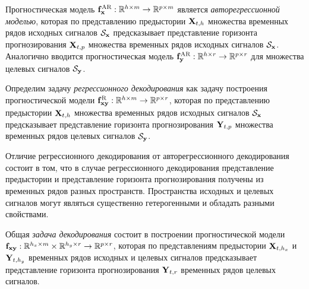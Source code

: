 \documentclass[11pt, a5paper]{dissert}
\begin{document}
\begin{definition}
	\label{ch1:def:autoreg_model}
	Прогностическая модель $\mathbf{f}^{\text{AR}}_{\mathbf{x}}: \mathbb{R}^{h \times m} \rightarrow \mathbb{R}^{p \times m}$ является \textit{авторегрессионной моделью}, которая по представлению предыстории $\mathbf{X}_{t,h}$ множества временных рядов исходных сигналов $\mathcal{S}_{\mathbf{x}}$ предсказывает представление горизонта прогнозирования $\mathbf{X}_{t,p}$ множества временных рядов исходных сигналов $\mathcal{S}_{\mathbf{x}}$.
	Аналогично вводится прогностическая модель $\mathbf{f}^{\text{AR}}_{\mathbf{y}}: \mathbb{R}^{h \times r} \rightarrow \mathbb{R}^{p \times r}$ для множества целевых сигналов $\mathcal{S}_{\mathbf{y}}$.
\end{definition}

\begin{definition}
	\label{ch1:def:reg_model}
	Определим задачу \textit{регрессионного декодирования} как задачу построения прогностической модели $\mathbf{f}^{\text{R}}_{\mathbf{x}\mathbf{y}}: \mathbb{R}^{h \times m} \rightarrow \mathbb{R}^{p \times r}$, которая по представлению предыстории $\mathbf{X}_{t,h}$ множества временных рядов исходных сигналов $\mathcal{S}_{\mathbf{x}}$ предсказывает представление горизонта прогнозирования $\mathbf{Y}_{t,p}$ множества временных рядов целевых сигналов $\mathcal{S}_{\mathbf{y}}$.
\end{definition}

Отличие регрессионного декодирования от авторегрессионного декодирования состоит в том, что в случае регрессионного декодирования представление предыстории и представление горизонта прогнозирования получены из временных рядов разных пространств. 
Пространства исходных и целевых сигналов могут являться существенно гетерогенными и обладать разными свойствами.

\begin{definition}
	\label{ch1:def:decode_model}
	Общая \textit{задача декодирования} состоит в построении прогностической модели $\mathbf{f}_{\mathbf{x}\mathbf{y}}: \mathbb{R}^{h_x \times m} \times \mathbb{R}^{h_y \times r} \rightarrow \mathbb{R}^{p \times r}$, которая по представлениям предыстории $\mathbf{X}_{t,h_x}$ и $\mathbf{Y}_{t,h_y}$ временных рядов исходных и целевых сигналов предсказывает представление горизонта прогнозирования $\mathbf{Y}_{t,r}$ временных рядов целевых сигналов. 
\end{definition}
\end{document}

